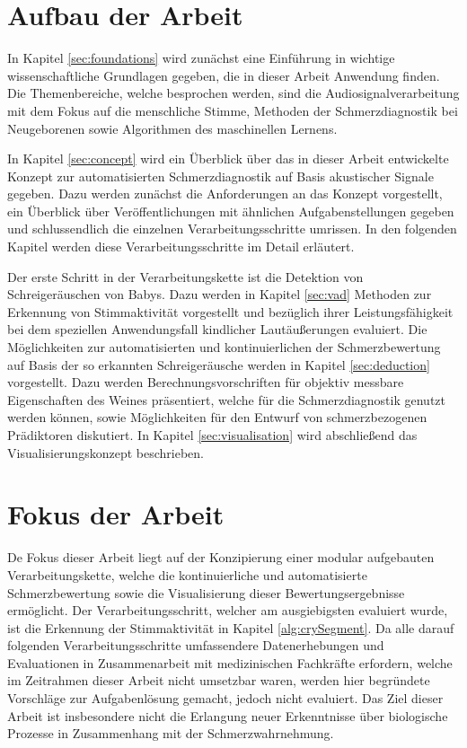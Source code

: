 \section{Aufbau der Arbeit}

In Kapitel \ref{sec:foundations} wird zunächst eine Einführung in wichtige wissenschaftliche Grundlagen gegeben, die in dieser Arbeit Anwendung finden. Die Themenbereiche, welche besprochen werden, sind die Audiosignalverarbeitung mit dem Fokus auf die menschliche Stimme, Methoden der Schmerzdiagnostik bei Neugeborenen sowie Algorithmen des maschinellen Lernens. 

In Kapitel \ref{sec:concept} wird ein Überblick über das in dieser Arbeit entwickelte Konzept zur automatisierten Schmerzdiagnostik auf Basis akustischer Signale gegeben. Dazu werden zunächst die Anforderungen an das Konzept vorgestellt, ein Überblick über Veröffentlichungen mit ähnlichen Aufgabenstellungen gegeben und schlussendlich die einzelnen Verarbeitungsschritte umrissen. In den folgenden Kapitel werden diese Verarbeitungsschritte im Detail erläutert. 

Der erste Schritt in der Verarbeitungskette ist die Detektion von Schreigeräuschen von Babys. Dazu werden in Kapitel \ref{sec:vad} Methoden zur Erkennung von Stimmaktivität vorgestellt und bezüglich ihrer Leistungsfähigkeit bei dem speziellen Anwendungsfall kindlicher Lautäußerungen evaluiert. Die Möglichkeiten zur automatisierten und kontinuierlichen der Schmerzbewertung auf Basis der so erkannten Schreigeräusche werden in Kapitel \ref{sec:deduction} vorgestellt. Dazu werden Berechnungsvorschriften für objektiv messbare Eigenschaften des Weines präsentiert, welche für die Schmerzdiagnostik genutzt werden können, sowie Möglichkeiten für den Entwurf von schmerzbezogenen Prädiktoren diskutiert. In Kapitel \ref{sec:visualisation} wird abschließend das Visualisierungskonzept beschrieben.

\section{Fokus der Arbeit}

De Fokus dieser Arbeit liegt auf der Konzipierung einer modular aufgebauten Verarbeitungskette, welche die kontinuierliche und automatisierte Schmerzbewertung sowie die Visualisierung dieser Bewertungsergebnisse ermöglicht. Der Verarbeitungsschritt, welcher am ausgiebigsten evaluiert wurde, ist die Erkennung der Stimmaktivität in Kapitel \ref{alg:crySegment}. Da alle darauf folgenden Verarbeitungsschritte umfassendere Datenerhebungen und Evaluationen in Zusammenarbeit mit medizinischen Fachkräfte erfordern, welche im Zeitrahmen dieser Arbeit nicht umsetzbar waren, werden hier begründete Vorschläge zur Aufgabenlösung gemacht, jedoch nicht evaluiert. Das Ziel dieser Arbeit ist insbesondere nicht die Erlangung neuer Erkenntnisse über biologische Prozesse in Zusammenhang mit der Schmerzwahrnehmung.
